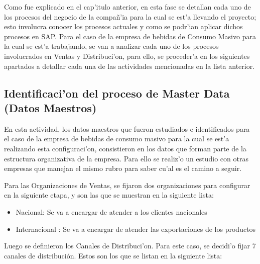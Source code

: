 	Como fue explicado en el cap'itulo anterior, en esta fase se detallan cada uno de los procesos del negocio de la compa\~n'ia para la cual se est'a llevando el proyecto; esto involucra conocer los procesos actuales y como se podr'ian aplicar dichos procesos en SAP. 
\newline
\newline
\indent Para el caso de la empresa de bebidas de Consumo Masivo para la cual se est'a trabajando, se van a analizar cada uno de los procesos involucrados en Ventas y Distribuci'on, para ello, se proceder'a en los siguientes apartados a detallar cada una de las actividades mencionadas en la lista anterior.
	
\subsection{Identificaci'on del proceso de Master Data (Datos Maestros)}
	En esta actividad, los datos maestros que fueron estudiados e identificados para el caso de la empresa de bebidas de consumo masivo para la cual se est'a realizando esta configuraci'on, consistieron en los datos que forman parte de la estructura organizativa de la empresa. Para ello se realiz'o un estudio con otras empresas que manejan el mismo rubro para saber cu'al es el camino a seguir. 

	Para las Organizaciones de Ventas, se fijaron dos organizaciones para configurar en la siguiente etapa, y son las que se muestran en la siguiente lista:

\begin{itemize}

\item Nacional: Se va a encargar de atender a los clientes nacionales
\item Internacional : Se va a encargar de atender las exportaciones de los productos
\end{itemize}
	Luego se definieron los Canales de Distribuci'on. Para este caso, se decidi'o fijar 7 canales de distribución. Estos son los que se listan en la siguiente lista:

